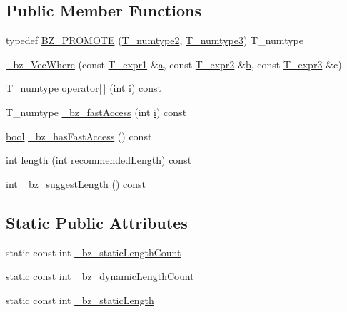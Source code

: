 \subsection*{Public Member Functions}
\begin{DoxyCompactItemize}
\item 
typedef \hyperlink{class__bz__VecWhere_a27ce214827712a0e69faab9bb1469a50}{B\+Z\+\_\+\+P\+R\+O\+M\+O\+T\+E} (\hyperlink{class__bz__VecWhere_a82e31f20b77e9657a8cb8ab4d20e9ba7}{T\+\_\+numtype2}, \hyperlink{class__bz__VecWhere_a7e0fa3a4525aa350c436e97d0e131394}{T\+\_\+numtype3}) T\+\_\+numtype
\item 
\hyperlink{class__bz__VecWhere_abc12ab3c75730585d5adc7f4553802a7}{\+\_\+bz\+\_\+\+Vec\+Where} (const \hyperlink{class__bz__VecWhere_a1be44d6fc5a189edccb63d669a39d911}{T\+\_\+expr1} \&\hyperlink{gen__mat5files_8m_aae328bf20413f220e38aec4d95bfd6da}{a}, const \hyperlink{class__bz__VecWhere_af11819044d65ec1172e5f5bff5925dea}{T\+\_\+expr2} \&\hyperlink{gen__mat5files_8m_a7b38767b3b6a8dae167e5afa4fc340b0}{b}, const \hyperlink{class__bz__VecWhere_add1351585098ebec2a48f1b6fbe18761}{T\+\_\+expr3} \&c)
\item 
T\+\_\+numtype \hyperlink{class__bz__VecWhere_abc286a4078e01fff06e665877be593f2}{operator\mbox{[}$\,$\mbox{]}} (int \hyperlink{indexexpr_8h_aabd77643995707c185e95c8cb2782c81}{i}) const 
\item 
T\+\_\+numtype \hyperlink{class__bz__VecWhere_ab24fee777c262ece6408f4c9d99fb1de}{\+\_\+bz\+\_\+fast\+Access} (int \hyperlink{indexexpr_8h_aabd77643995707c185e95c8cb2782c81}{i}) const 
\item 
\hyperlink{compiler_8h_abb452686968e48b67397da5f97445f5b}{bool} \hyperlink{class__bz__VecWhere_a6ae07e1b40d2daa233f61f52c22fd30b}{\+\_\+bz\+\_\+has\+Fast\+Access} () const 
\item 
int \hyperlink{class__bz__VecWhere_af902aac44d581114d9329466043e5840}{length} (int recommended\+Length) const 
\item 
int \hyperlink{class__bz__VecWhere_a3eafe1733804a67d9250250422a4d139}{\+\_\+bz\+\_\+suggest\+Length} () const 
\end{DoxyCompactItemize}
\subsection*{Static Public Attributes}
\begin{DoxyCompactItemize}
\item 
static const int \hyperlink{class__bz__VecWhere_a9b8b6bd4c034bd899ad8370387af5306}{\+\_\+bz\+\_\+static\+Length\+Count}
\item 
static const int \hyperlink{class__bz__VecWhere_a1fbfa6f7221cfd234dd4acd038ccd853}{\+\_\+bz\+\_\+dynamic\+Length\+Count}
\item 
static const int \hyperlink{class__bz__VecWhere_a0518cd41c6d8268d0d7713cac78f6e6f}{\+\_\+bz\+\_\+static\+Length}
\end{DoxyCompactItemize}


